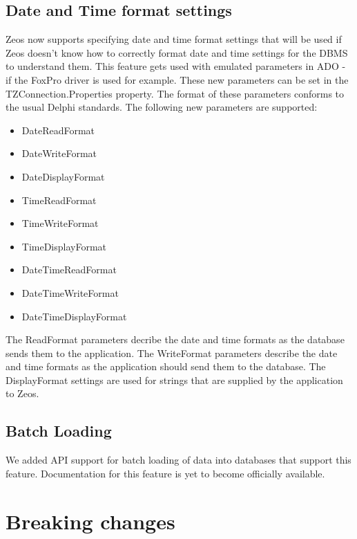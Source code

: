 \documentclass[a4paper,12pt,oneside]{article}
\begin{document}
\subsection{Date and Time format settings}
\label{sec:GeneralChanges_DateAndTimeFormatSettings}
Zeos now supports specifying date and time format settings that will be used if Zeos doesn't know how to correctly format date and time settings for the DBMS to understand them.
This feature gets used with emulated parameters in ADO - if the FoxPro driver is used for example.
These new parameters can be set in the TZConnection.Properties property.
The format of these parameters conforms to the usual Delphi standards.
The following new parameters are supported:
\begin{itemize}
\item DateReadFormat
\item DateWriteFormat
\item DateDisplayFormat
\item TimeReadFormat
\item TimeWriteFormat
\item TimeDisplayFormat
\item DateTimeReadFormat
\item DateTimeWriteFormat
\item DateTimeDisplayFormat
\end{itemize}
The ReadFormat parameters decribe the date and time formats as the database sends them to the application.
The WriteFormat parameters describe the date and time formats as the application should send them to the database.
The DisplayFormat settings are used for strings that are supplied by the application to Zeos.

\subsection{Batch Loading}
\label{sec:GeneralChanges_BatchLoading}
We added API support for batch loading of data into databases that support this feature.
Documentation for this feature is yet to become officially available.

\section{Breaking changes}
\label{sec:BreakingChanges}
\end{document}
